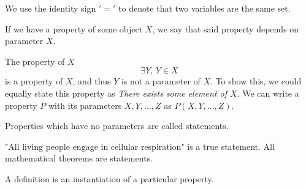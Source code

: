 \documentclass{article}
\begin{document}
\begin{remark}
	We use the identity sign $'$\(=\)$'$ to denote that two variables are the same set.
\end{remark}
\begin{definition}[Parameter]
	If we have a property of some object \(X\), we say that said property depends on parameter \(X\).
\end{definition}
\begin{example}
	The property of \(X\)
	\begin{equation*}
		\exists Y,\,Y\in X
	\end{equation*}
	is a property of \(X\), and thus \(Y\) is not a parameter of \(X\). To show this, we could equally state this property as \emph{There exists some element of \(X\)}. We can write a property \(P\) with its parameters \(X,Y,\ldots, Z\) as \(P(X,Y,\dots, Z)\).
\end{example}
\begin{definition}[Statement]
	Properties which have no parameters are called statements.
\end{definition}
\begin{example}
	"All living people engage in cellular respiration" is a true statement. All mathematical theorems are statements.
\end{example}
\begin{definition}[Definition]
	A definition is an instantiation of a particular property.
\end{definition}
\end{document}
